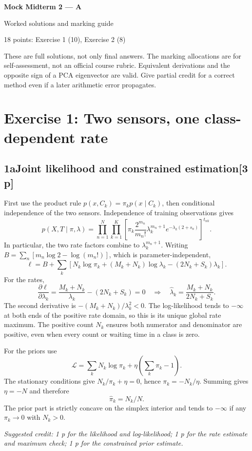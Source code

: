 \documentclass[11pt,a4paper]{article}
\newcommand{\solution}[3]{\Needspace{6\baselineskip}\subsection*{\color{examblue}#1\quad #2\hfill\normalsize[#3 p]}}
\newcommand{\selfcredit}[1]{\par\textit{Suggested credit: #1}\par}
\begin{document}
\begin{center}
{\Huge\bfseries\color{examblue}Mock Midterm 2 --- A}\par
\vspace{0.5em}
{\LARGE Worked solutions and marking guide}\par
\vspace{0.7em}
{\large 18 points: Exercise 1 (10), Exercise 2 (8)}
\end{center}
These are full solutions, not only final answers. The marking allocations are for
self-assessment, not an official course rubric. Equivalent derivations and the
opposite sign of a PCA eigenvector are valid. Give partial credit for a correct
method even if a later arithmetic error propagates.

\section*{Exercise 1: Two sensors, one class-dependent rate}
\solution{1a}{Joint likelihood and constrained estimation}{3}
First use the product rule $p(x,C_k)=\pi_kp(x\mid C_k)$, then conditional
independence of the two sensors. Independence of training observations gives
\[
p(X,T\mid\pi,\lambda)=\prod_{n=1}^N\prod_{k=1}^K
\left[\pi_k\frac{2^{m_n}}{m_n!}\lambda_k^{m_n+1}
e^{-\lambda_k(2+s_n)}\right]^{t_{nk}}.
\]
In particular, the two rate factors combine to $\lambda_k^{m_n+1}$.
Writing $B=\sum_n[m_n\log2-\log(m_n!)]$, which is parameter-independent,
\[
\ell=B+\sum_k\left[N_k\log\pi_k+(M_k+N_k)\log\lambda_k
-(2N_k+S_k)\lambda_k\right].
\]
For the rates,
\[
\frac{\partial\ell}{\partial\lambda_k}
=\frac{M_k+N_k}{\lambda_k}-(2N_k+S_k)=0
\quad\Longrightarrow\quad
\boxed{\widehat\lambda_k=\frac{M_k+N_k}{2N_k+S_k}}.
\]
The second derivative is $-(M_k+N_k)/\lambda_k^2<0$. The log-likelihood tends
to $-\infty$ at both ends of the positive rate domain, so this is its unique
global rate maximum. The positive count $N_k$ ensures both numerator and
denominator are positive, even when every count or waiting time in a class is zero.

For the priors use
\[
\mathcal L=\sum_kN_k\log\pi_k+\eta\left(\sum_k\pi_k-1\right).
\]
The stationary conditions give $N_k/\pi_k+\eta=0$, hence
$\pi_k=-N_k/\eta$. Summing gives $\eta=-N$ and therefore
\[
\boxed{\widehat\pi_k=N_k/N}.
\]
The prior part is strictly concave on the simplex interior and tends to
$-\infty$ if any $\pi_k\to0$ with $N_k>0$.
\selfcredit{1 p for the likelihood and log-likelihood; 1 p for the rate estimate and maximum check; 1 p for the constrained prior estimate.}
\end{document}
